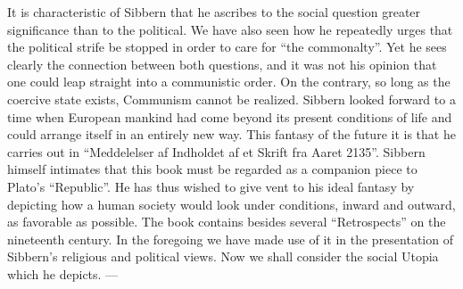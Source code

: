 \documentclass[12pt,a4paper,openany]{book}
\begin{document}
It is characteristic of Sibbern that he ascribes to the
social question greater significance than to the political. We
have also seen how he repeatedly urges
that the political strife be stopped in order to care for ``the commonalty''.
Yet he sees clearly the connection between both questions,
and it was not his opinion that one could leap straight
into a communistic order. On the contrary, so long as
the coercive state exists, Communism cannot be realized.
Sibbern looked forward to a time when European
mankind had come beyond its present conditions of life and
could arrange itself in an entirely new way. This
fantasy of the future it is that he carries out in ``Meddelelser af Indholdet af et
Skrift fra Aaret 2135''. Sibbern himself intimates that this book
must be regarded as a companion piece to Plato's ``Republic''. He
has thus wished to give vent to his ideal fantasy by depicting
how a human society would look under conditions, inward and outward, as favorable
as possible. The book contains besides
several ``Retrospects'' on the nineteenth century. In the
foregoing we have made use of it in the presentation of Sibbern's
religious and political views. Now we shall consider the
social Utopia which he depicts. ---
\end{document}
